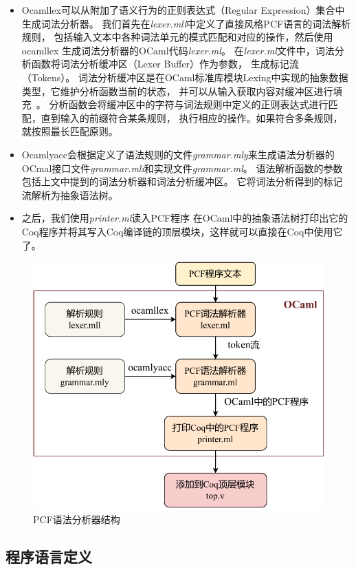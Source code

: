 \begin{itemize}
    \item Ocamllex可以从附加了语义行为的正则表达式（Regular Expression）集合中生成词法分析器。
    我们首先在\textit{lexer.mll}中定义了直接风格PCF语言的词法解析规则，
    包括输入文本中各种词法单元的模式匹配和对应的操作，然后使用ocamllex
    生成词法分析器的OCaml代码\textit{lexer.ml}。
    在\textit{lexer.ml}文件中，词法分析函数将词法分析缓冲区（Lexer Buffer）作为参数，
    生成标记流（Tokens）。
    词法分析缓冲区是在OCaml标准库模块Lexing中实现的抽象数据类型，它维护分析函数当前的状态，
    并可以从输入获取内容对缓冲区进行填充~\cite{leroy2021ocaml}。
    分析函数会将缓冲区中的字符与词法规则中定义的正则表达式进行匹配，直到输入的前缀符合某条规则，
    执行相应的操作。如果符合多条规则，就按照最长匹配原则。
    \item Ocamlyacc会根据定义了语法规则的文件\textit{grammar.mly}来生成语法分析器的
    OCmal接口文件\textit{grammar.mli}和实现文件\textit{grammar.ml}。
    语法解析函数的参数包括上文中提到的词法分析器和词法分析缓冲区。
    它将词法分析得到的标记流解析为抽象语法树。
    \item 之后，我们使用\textit{printer.ml}读入PCF程序
    在OCaml中的抽象语法树打印出它的Coq程序并将其写入Coq编译链的顶层模块，这样就可以直接在Coq中使用它了。
\end{itemize}

\begin{figure}[htbp]
    \centering
    \vspace{2ex}
    \includegraphics[width=0.7\linewidth]{figures/pcfparser.pdf}
    \caption{PCF语法分析器结构}\label{fig:parser}
\end{figure}

\subsection{程序语言定义}

